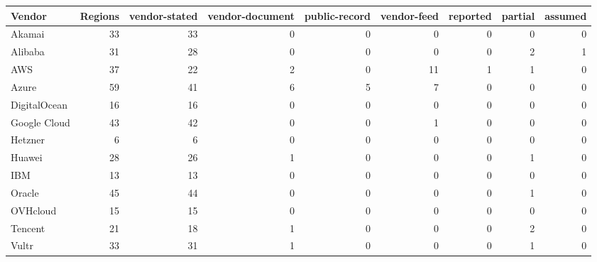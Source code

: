\begin{tabular}{lrrrrrrrr}
\toprule
Vendor & Regions & vendor-stated & vendor-document & public-record & vendor-feed & reported & partial & assumed \\
\midrule
Akamai & 33 & 33 & 0 & 0 & 0 & 0 & 0 & 0 \\
Alibaba & 31 & 28 & 0 & 0 & 0 & 0 & 2 & 1 \\
AWS & 37 & 22 & 2 & 0 & 11 & 1 & 1 & 0 \\
Azure & 59 & 41 & 6 & 5 & 7 & 0 & 0 & 0 \\
DigitalOcean & 16 & 16 & 0 & 0 & 0 & 0 & 0 & 0 \\
Google Cloud & 43 & 42 & 0 & 0 & 1 & 0 & 0 & 0 \\
Hetzner & 6 & 6 & 0 & 0 & 0 & 0 & 0 & 0 \\
Huawei & 28 & 26 & 1 & 0 & 0 & 0 & 1 & 0 \\
IBM & 13 & 13 & 0 & 0 & 0 & 0 & 0 & 0 \\
Oracle & 45 & 44 & 0 & 0 & 0 & 0 & 1 & 0 \\
OVHcloud & 15 & 15 & 0 & 0 & 0 & 0 & 0 & 0 \\
Tencent & 21 & 18 & 1 & 0 & 0 & 0 & 2 & 0 \\
Vultr & 33 & 31 & 1 & 0 & 0 & 0 & 1 & 0 \\
\bottomrule
\end{tabular}
